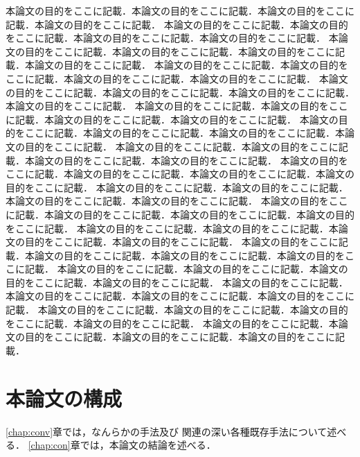 本論文の目的をここに記載．本論文の目的をここに記載．本論文の目的をここに記載．本論文の目的をここに記載．
本論文の目的をここに記載．本論文の目的をここに記載．本論文の目的をここに記載．本論文の目的をここに記載．
本論文の目的をここに記載．本論文の目的をここに記載．本論文の目的をここに記載．本論文の目的をここに記載．
本論文の目的をここに記載．本論文の目的をここに記載．本論文の目的をここに記載．本論文の目的をここに記載．
本論文の目的をここに記載．本論文の目的をここに記載．本論文の目的をここに記載．本論文の目的をここに記載．
本論文の目的をここに記載．本論文の目的をここに記載．本論文の目的をここに記載．本論文の目的をここに記載．
本論文の目的をここに記載．本論文の目的をここに記載．本論文の目的をここに記載．本論文の目的をここに記載．
本論文の目的をここに記載．本論文の目的をここに記載．本論文の目的をここに記載．本論文の目的をここに記載．
本論文の目的をここに記載．本論文の目的をここに記載．本論文の目的をここに記載．本論文の目的をここに記載．
本論文の目的をここに記載．本論文の目的をここに記載．本論文の目的をここに記載．本論文の目的をここに記載．
本論文の目的をここに記載．本論文の目的をここに記載．本論文の目的をここに記載．本論文の目的をここに記載．
本論文の目的をここに記載．本論文の目的をここに記載．本論文の目的をここに記載．本論文の目的をここに記載．
本論文の目的をここに記載．本論文の目的をここに記載．本論文の目的をここに記載．本論文の目的をここに記載．
本論文の目的をここに記載．本論文の目的をここに記載．本論文の目的をここに記載．本論文の目的をここに記載．
本論文の目的をここに記載．本論文の目的をここに記載．本論文の目的をここに記載．本論文の目的をここに記載．
本論文の目的をここに記載．本論文の目的をここに記載．本論文の目的をここに記載．本論文の目的をここに記載．
本論文の目的をここに記載．本論文の目的をここに記載．本論文の目的をここに記載．本論文の目的をここに記載．

\section{本論文の構成}
\ref{chap:conv}章では，なんらかの手法\cite{Kitamura2016taslp}及び
関連の深い各種既存手法\cite{Kitamura2016IWAENC}について述べる．
\ref{chap:con}章では，本論文の結論を述べる．
